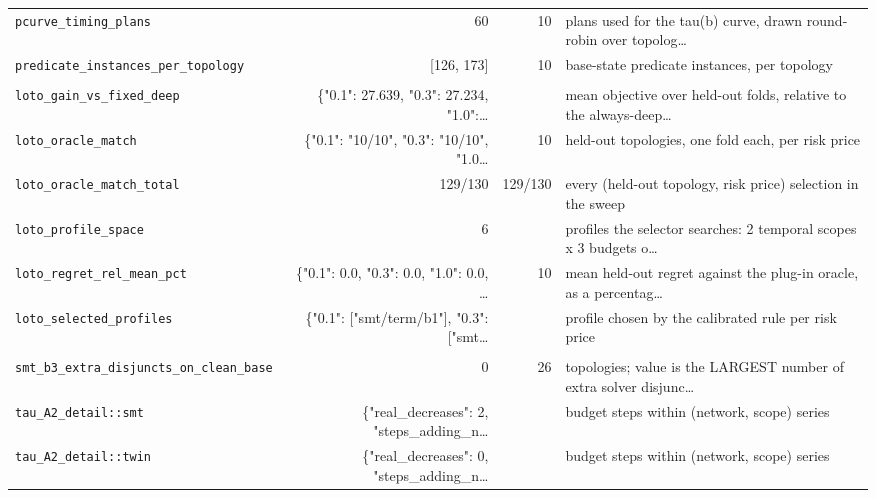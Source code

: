 \begin{center}
\begin{longtable}{@{}p{}rrp{}@{}}
\texttt{\scriptsize pcurve\_\allowbreak timing\_\allowbreak plans} & 60 & 10 & plans used for the tau(b) curve, drawn round-robin over topolog… \\
\texttt{\scriptsize predicate\_\allowbreak instances\_\allowbreak per\_\allowbreak topology} & [126, 173] & 10 & base-state predicate instances, per topology \\
\addlinespace
\multicolumn{4}{l}{\textbf{out/corpus\_v2/selection.json}}\\
\texttt{\scriptsize loto\_\allowbreak gain\_\allowbreak vs\_\allowbreak fixed\_\allowbreak deep} & \{"0.1": 27.639, "0.3": 27.234, "1.0":… &  & mean objective over held-out folds, relative to the always-deep… \\
\texttt{\scriptsize loto\_\allowbreak oracle\_\allowbreak match} & \{"0.1": "10/10", "0.3": "10/10", "1.0… & 10 & held-out topologies, one fold each, per risk price \\
\texttt{\scriptsize loto\_\allowbreak oracle\_\allowbreak match\_\allowbreak total} & 129/130 & 129/130 & every (held-out topology, risk price) selection in the sweep \\
\texttt{\scriptsize loto\_\allowbreak profile\_\allowbreak space} & 6 &  & profiles the selector searches: 2 temporal scopes x 3 budgets o… \\
\texttt{\scriptsize loto\_\allowbreak regret\_\allowbreak rel\_\allowbreak mean\_\allowbreak pct} & \{"0.1": 0.0, "0.3": 0.0, "1.0": 0.0, … & 10 & mean held-out regret against the plug-in oracle, as a percentag… \\
\texttt{\scriptsize loto\_\allowbreak selected\_\allowbreak profiles} & \{"0.1": ["smt/term/b1"], "0.3": ["smt… &  & profile chosen by the calibrated rule per risk price \\
\addlinespace
\multicolumn{4}{l}{\textbf{out/costbench\_v3/costbench.json}}\\
\texttt{\scriptsize smt\_\allowbreak b3\_\allowbreak extra\_\allowbreak disjuncts\_\allowbreak on\_\allowbreak clean\_\allowbreak base} & 0 & 26 & topologies; value is the LARGEST number of extra solver disjunc… \\
\texttt{\scriptsize tau\_\allowbreak A2\_\allowbreak detail:\allowbreak :\allowbreak smt} & \{"real\_decreases": 2, "steps\_adding\_n… &  & budget steps within (network, scope) series \\
\texttt{\scriptsize tau\_\allowbreak A2\_\allowbreak detail:\allowbreak :\allowbreak twin} & \{"real\_decreases": 0, "steps\_adding\_n… &  & budget steps within (network, scope) series \\

\end{longtable}
\end{center}
